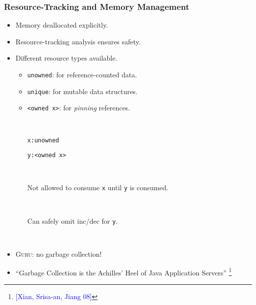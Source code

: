 \documentclass[10pt]{beamer}
\begin{document}
\begin{frame}
\frametitle{Resource-Tracking and Memory Management}

\begin{itemize}
\item Memory deallocated explicitly.
\item Resource-tracking analysis ensures safety.
\item Different resource types available.
\begin{itemize}
\item \texttt{unowned}: for reference-counted data.
\item \texttt{unique}: for mutable data structures.
\item \texttt{<owned x>}: for \emph{pinning} references.

\ 

\texttt{x:unowned}

\texttt{y:<owned x>}

\ 

Not allowed to consume \texttt{x} until \texttt{y} is consumed.

\ 

Can safely omit inc/dec for \texttt{y}.

\ 

\end{itemize}

\item \textsc{Guru}: no garbage collection!
\item ``Garbage Collection is the Achilles' Heel of Java Application Servers'' \footnote{\textcolor{blue}{[Xian, Srisa-an, Jiang 08]}}
\end{itemize}

\end{frame}
\end{document}
